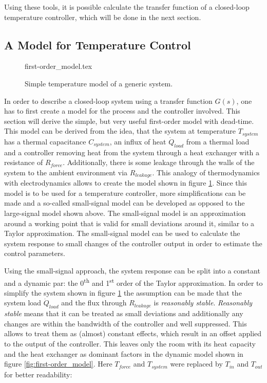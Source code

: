 Using these tools, it is possible calculate the transfer function of a closed-loop temperature controller, which will be done in the next section.

\subsection{A Model for Temperature Control}%
\label{sec:temperature_control_model}
\begin{figure}[ht]
    \centering
        {first-order_model.tex}
    \caption{Simple temperature model of a generic system.}
    \label{fig:first-order_model_room}
\end{figure}

In order to describe a closed-loop system using a transfer function $G(s)$, one has to first create a model for the process and the controller involved. This section will derive the simple, but very useful first-order model with dead-time. This model can be derived from the idea, that the system at temperature $T_{system}$ has a thermal capacitance $C_{system}$, an influx of heat $\dot Q_{load}$ from a thermal load and a controller removing heat from the system through a heat exchanger with a resistance of $R_{force}$. Additionally, there is some leakage through the walls of the system to the ambient environment via $R_{leakage}$. This analogy of thermodynamics with electrodynamics allows to create the model shown in figure \ref{fig:first-order_model_room}. Since this model is to be used for a temperature controller, more simplifications can be made and a so-called small-signal model can be developed as opposed to the large-signal model shown above. The small-signal model is an approximation around a working point that is valid for small deviations around it, similar to a Taylor approximation. The small-signal model can be used to calculate the system response to small changes of the controller output in order to estimate the control parameters.

Using the small-signal approach, the system response can be split into a constant and a dynamic par: the 0\textsuperscript{th} and 1\textsuperscript{st} order of the Taylor approximation. In order to simplify the system shown in figure \ref{fig:first-order_model_room} the assumption can be made that the system load $\dot Q_{load}$ and the flux through $R_{leakage}$ is \textit{reasonably stable}. \textit{Reasonably stable} means that it can be treated as small deviations and additionally any changes are within the bandwidth of the controller and well suppressed. This allows to treat them as (almost) constant effects, which result in an offset applied to the output of the controller. This leaves only the room with its heat capacity and the heat exchanger as dominant factors in the dynamic model shown in figure \ref{fig:first-order_model}. Here $T_{force}$ and $T_{system}$ were replaced by $T_{in}$ and $T_{out}$ for better readability:

